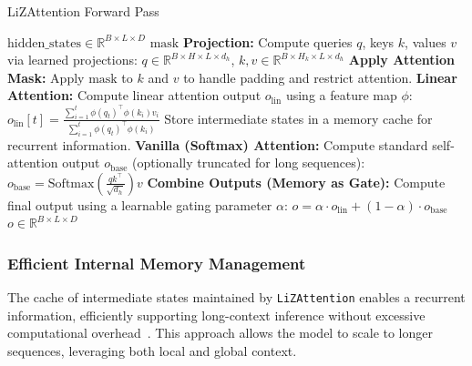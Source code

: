 \documentclass[10pt,a4paper]{article}
\begin{document}
\begin{algorithm}[H]
\caption{LiZAttention Forward Pass}
\label{alg:lizattention}
\begin{algorithmic}[1]
\Require $\text{hidden\_states} \in \mathbb{R}^{B \times L \times D}$ 
\Require $\text{mask}$ 
\State \textbf{Projection:}
    \Statex \hspace{1em} Compute queries $q$, keys $k$, values $v$ via learned projections:
    \Statex \hspace{1em} $q \in \mathbb{R}^{B \times H \times L \times d_h}$, $k, v \in \mathbb{R}^{B \times H_k \times L \times d_h}$
\State \textbf{Apply Attention Mask:}
    \Statex \hspace{1em} Apply $\text{mask}$ to $k$ and $v$ to handle padding and restrict attention.
\State \textbf{Linear Attention:}
    \Statex \hspace{1em} Compute linear attention output $o_{\mathrm{lin}}$ using a feature map $\phi$:
    \Statex \hspace{1em} $o_{\mathrm{lin}}[t] = \frac{\sum_{i=1}^{t} \phi(q_t)^\top \phi(k_i) v_i}{\sum_{i=1}^{t} \phi(q_t)^\top \phi(k_i)}$
    \Statex \hspace{1em} Store intermediate states in a memory cache for recurrent information.
\State \textbf{Vanilla (Softmax) Attention:}
    \Statex \hspace{1em} Compute standard self-attention output $o_{\mathrm{base}}$ (optionally truncated for long sequences):
    \Statex \hspace{1em} $o_{\mathrm{base}} = \text{Softmax}\left(\frac{q k^\top}{\sqrt{d_h}}\right) v$
\State \textbf{Combine Outputs (Memory as Gate):}
    \Statex \hspace{1em} Compute final output using a learnable gating parameter $\alpha$:
    \Statex \hspace{1em} $o = \alpha \cdot o_{\mathrm{lin}} + (1-\alpha) \cdot o_{\mathrm{base}}$
\State \Return $o \in \mathbb{R}^{B \times L \times D}$
\end{algorithmic}
\end{algorithm}

\subsubsection{Efficient Internal Memory Management}

The cache of intermediate states maintained by \texttt{LiZAttention} enables a recurrent information, efficiently supporting long-context inference without excessive computational overhead~\cite{katharopoulos2020transformers}. This approach allows the model to scale to longer sequences, leveraging both local and global context.
\end{document}
